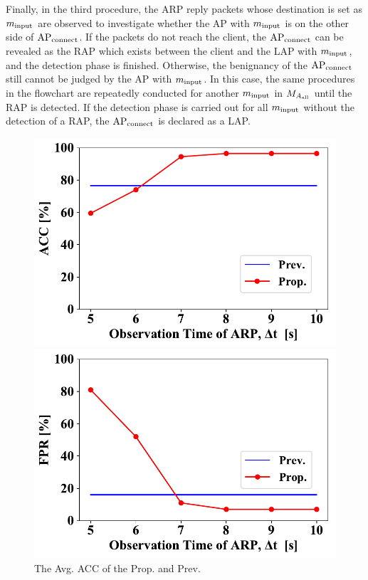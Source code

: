 \documentclass[paper]{ieice}
\newcommand{\tarAP}{\rm AP_{connect}}
\newcommand{\inputMAC}{m_{\rm input}}
\begin{document}
Finally, in the third procedure, the ARP reply packets whose destination is set as $\inputMAC$ are observed to investigate whether the AP with $\inputMAC$ is on the other side of $\tarAP$.
If the packets do not reach the client, the $\tarAP$ can be revealed as the RAP which exists between the client and the LAP with $\inputMAC$, and the detection phase is finished.
Otherwise, the benignancy of the $\tarAP$ still cannot be judged by the AP with $\inputMAC$.
In this case, the same procedures in the flowchart are repeatedly conducted for another $\inputMAC$ in $M_{A_{\rm all}}$ until the RAP is detected.
If the detection phase is carried out for all $\inputMAC$ without the detection of a RAP, the $\tarAP$ is declared as a LAP.
\begin{figure}[ht]
    \begin{minipage}{0.33\hsize}
        \begin{center}
            \includegraphics[scale=0.34]{figure/ACC.pdf}
        \end{center}
        \caption{The Avg. ACC of the Prop. and Prev.}
        \label{fig:acc}
    \end{minipage}
        \begin{minipage}{0.33\hsize}
        \begin{center}
            \includegraphics[scale=0.34]{figure/FPR.pdf}

\end{center}
\end{minipage}
\end{figure}
\end{document}
